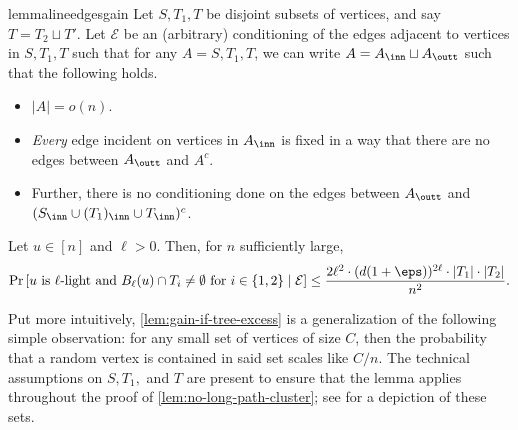 \documentclass[11pt,letterpaper]{article}
\begin{document}
    \begin{restatable}{lemma}{lineedgesgain}
        \label{lem:gain-if-tree-excess}
        Let $S,T_1,T$ be disjoint subsets of vertices, and say $T = T_2 \sqcup T'$. Let $\mathcal{E}$ be an (arbitrary) conditioning of the edges adjacent to vertices in $S,T_1,T$ such that for any $A = S,T_1,T$, we can write $A = A_{\inn} \sqcup A_{\outt}$ such that the following holds.
        \begin{itemize}
            \item $|A| = o(n)$.
            \item \emph{Every} edge incident on vertices in $A_{\inn}$ is fixed in a way that there are no edges between $A_{\outt}$ and $A^c$.
            \item Further, there is no conditioning done on the edges between $A_{\outt}$ and $(S_{\inn} \cup (T_1)_{\inn} \cup T_{\inn})^c$.
        \end{itemize}
        Let $u \in [n]$ and $\ell > 0$. Then, for $n$ sufficiently large,
        \[ \Pr\left[ \text{$u$ is $\ell$-light and } B_{\ell}(u) \cap T_i \ne \emptyset \text{ for } i \in \{1, 2\} \mid \mathcal{E} \right] \le \frac{2\ell^2 \cdot (d(1+\eps))^{2\ell} \cdot |T_1| \cdot |T_2|}{n^2}. \]
    \end{restatable}
    \begin{remark}
    Put more intuitively, \cref{lem:gain-if-tree-excess} is a generalization of the following simple observation: for any small set of vertices of size $C$, then the probability that a random vertex is contained in said set scales like $C/n$. 
    The technical assumptions on $S, T_1,$ and $T$ are present to ensure that the lemma applies throughout the proof of \cref{lem:no-long-path-cluster}; see  for a depiction of these sets.
    \end{remark}
\end{document}
